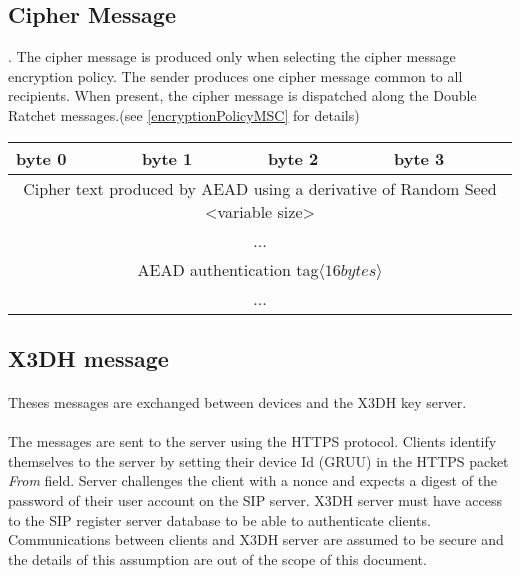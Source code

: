 \documentclass[a4paper,11pt]{article}
\begin{document}
  \subsection{Cipher Message}. The cipher message is produced only when selecting the cipher message encryption policy. The sender produces one cipher message common to all recipients. When present, the cipher message is dispatched along the Double Ratchet messages.(see \ref{encryptionPolicyMSC} for details)
      \begin{center}
      \begin{tabular}{ | p{1.4in} | p{1.4in} | p{1.4in} | p{1.4in} |}
        \hline
        \cellcolor[gray]{0.85} byte 0 & \cellcolor[gray]{0.85} byte 1 & \cellcolor[gray]{0.85} byte 2 & \cellcolor[gray]{0.85}byte 3\\
        \hline
        \multicolumn{4}{|c|}{Cipher text produced by AEAD using a derivative of Random Seed <variable size>}\\
        \multicolumn{4}{|c|}{...}\\
        \hline
        \multicolumn{4}{|c|}{AEAD authentication tag$\langle 16bytes\rangle $}\\
        \multicolumn{4}{|c|}{...}\\
        \hline
      \end{tabular}
      \end{center}
  \subsection{X3DH message}
    \paragraph{}Theses messages are exchanged between devices and the X3DH key server.
    \paragraph*{}The messages are sent to the server using the HTTPS protocol. Clients identify themselves to the server by setting their device Id (GRUU) in the HTTPS packet \textit{From} field. Server challenges the client with a nonce and expects a digest of the password of their user account on the SIP server. X3DH server must have access to the SIP register server database to be able to authenticate clients. Communications between clients and X3DH server are assumed to be secure and the details of this assumption are out of the scope of this document.
\end{document}
